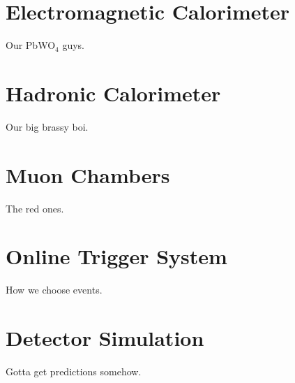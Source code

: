 \section{Electromagnetic Calorimeter}

Our PbWO$_{4}$ guys.

\section{Hadronic Calorimeter}

Our big brassy boi.

\section{Muon Chambers}

The red ones.

\section{Online Trigger System}

How we choose events.

\section{Detector Simulation}

Gotta get predictions somehow.



